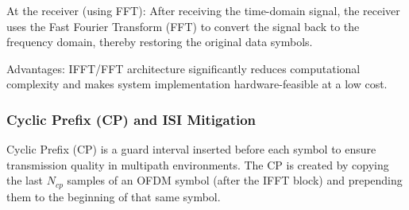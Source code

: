 \documentclass[a4paper]{article}
\begin{document}
At the receiver (using FFT): After receiving the time-domain signal, the receiver uses the Fast Fourier Transform (FFT) to convert the signal back to the frequency domain, thereby restoring the original data symbols.

Advantages: IFFT/FFT architecture significantly reduces computational complexity and makes system implementation hardware-feasible at a low cost.

\subsubsection{Cyclic Prefix (CP) and ISI Mitigation}
Cyclic Prefix (CP) is a guard interval inserted before each symbol to ensure transmission quality in multipath environments. The CP is created by copying the last $N_{cp}$ samples of an OFDM symbol (after the IFFT block) and prepending them to the beginning of that same symbol.
\end{document}
